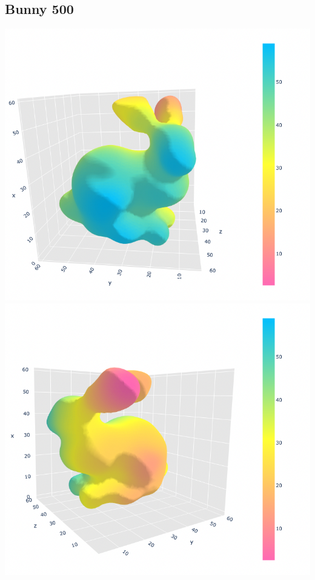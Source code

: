 \documentclass{article}
\begin{document}
\subsection*{Bunny 500}
\includegraphics[scale=0.4]{images/500mls}
\newline 
\includegraphics[scale=0.4]{images/500mls2}
\end{document}
